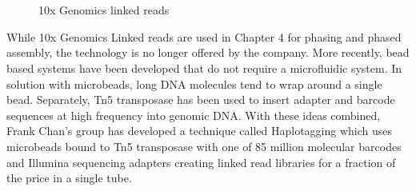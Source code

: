 \begin{figure}[htbp!]

\caption{10x Genomics linked reads}
\label{figure:linkedreads}
\begin{centering}
 \\
 \\
\end{centering}
\end{figure}

\par{
While 10x Genomics Linked reads are used in Chapter 4 for phasing and phased assembly, the technology is no longer offered by the company. More recently, bead based systems have been developed that do not require a microfluidic system. In solution with microbeads, long DNA molecules tend to wrap around a single bead\cite{beadphasing}\cite{LFR}. Separately, Tn5 transposase has been used to insert adapter and barcode sequences at high frequency into genomic DNA\cite{cptseq}. With these ideas combined, Frank Chan's group has developed a technique called Haplotagging which uses microbeads bound to Tn5 transposase with one of 85 million molecular barcodes and Illumina sequencing adapters creating linked read libraries for a fraction of the price in a single tube\cite{haplotagging}.
}

